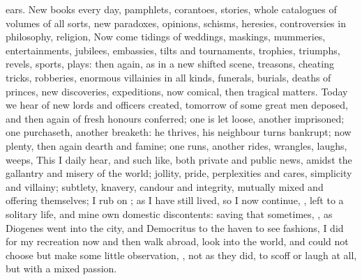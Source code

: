 ears. New books every day, pamphlets, corantoes, stories, whole catalogues of
volumes of all sorts, new paradoxes, opinions, schisms, heresies, controversies
in philosophy, religion, \etc{} Now come tidings of weddings, maskings,
mummeries, entertainments, jubilees, embassies, tilts and tournaments,
trophies, triumphs, revels, sports, plays: then again, as in a new shifted
scene, treasons, cheating tricks, robberies, enormous villainies in all kinds,
funerals, burials, deaths of princes, new discoveries, expeditions, now
comical, then tragical matters. Today we hear of new lords and officers
created, tomorrow of some great men deposed, and then again of fresh honours
conferred; one is let loose, another imprisoned; one purchaseth, another
breaketh: he thrives, his neighbour turns bankrupt; now plenty, then again
dearth and famine; one runs, another rides, wrangles, laughs, weeps, \etc{}
This I daily hear, and such like, both private and public news, amidst the
gallantry and misery of the world; jollity, pride, perplexities and cares,
simplicity and villainy; subtlety, knavery, candour and integrity, mutually
mixed and offering themselves; I rub on ; as I have still lived, so I now continue, , left
to a solitary life, and mine own domestic discontents: saving that sometimes,
, as Diogenes went into the city,
and Democritus to the haven to see fashions, I did for my recreation now and
then walk abroad, look into the world, and could not choose but make some
little observation, , not as they did, to scoff or laugh at all, but
with a mixed passion.


